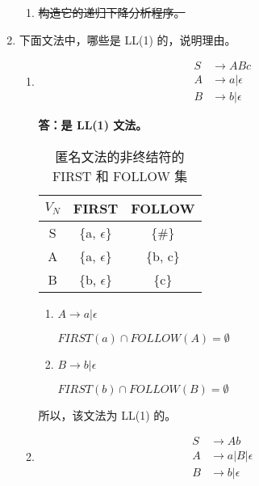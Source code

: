 \begin{enumerate}
\begin{enumerate}
        \item \sout{构造它的递归下降分析程序。}
    \end{enumerate}
    
    \item 下面文法中，哪些是 LL(1) 的，说明理由。
    
    \begin{enumerate}
        \item \begin{align*}
            S & \to ABc \\
            A & \to a | \epsilon \\
            B & \to b | \epsilon
        \end{align*}
        
        \textbf{答：是 LL(1) 文法。}
        
        \begin{table}[H]
            \centering
            \begin{tabular}{|c|c|c|}
                \hline
                $V_N$ & FIRST & FOLLOW \\
                \hline
                S & \{a, $\epsilon$\} & \{\#\} \\
                \hline
                A & \{a, $\epsilon$\} & \{b, c\} \\
                \hline
                B & \{b, $\epsilon$\} & \{c\} \\
                \hline
            \end{tabular}
            \caption{匿名文法的非终结符的 FIRST 和 FOLLOW 集}
            \label{tab:FF3_1}
        \end{table}
        
        \begin{enumerate}
            \item $A \to a | \epsilon$
            
            $FIRST(a) \cap FOLLOW(A) = \emptyset$
            
            \item $B \to b | \epsilon$
            
            $FIRST(b) \cap FOLLOW(B) = \emptyset$
            
        \end{enumerate}
        
        所以，该文法为 LL(1) 的。
        
        \item \begin{align*}
            S & \to Ab \\
            A & \to a | B | \epsilon \\
            B & \to b | \epsilon
        \end{align*}
        

\end{enumerate}
\end{enumerate}
